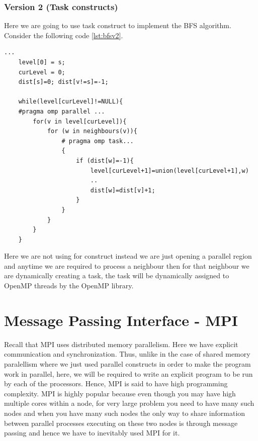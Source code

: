 \documentclass[12pt]{book}
\begin{document}
\subsubsection{Version 2 (Task constructs)}
Here we are going to use task construct to implement the BFS algorithm.
Consider the following code \ref{lst:bfsv2}.
\begin{lstlisting}[caption={BFS-Example},captionpos=b,label={lst:bfsv2}]
...
    level[0] = s;
    curLevel = 0;
    dist[s]=0; dist[v!=s]=-1;

    while(level[curLevel]!=NULL){
    #pragma omp parallel ...
        for(v in level[curLevel]){
            for (w in neighbours(v)){
                # pragma omp task...
                {
                    if (dist[w]=-1){
                        level[curLevel+1]=union(level[curLevel+1],w)
                        ..
                        dist[w]=dist[v]+1;
                    }
                }
            }       
        }   
    }
\end{lstlisting}
Here we are not using for construct instead we are just opening a parallel region and anytime we are required to process a neighbour then for that neighbour we are dynamically creating a task, the task will be dynamically assigned to OpenMP threads by the OpenMP library.

\newpage

\section{Message Passing Interface - MPI}
Recall that MPI uses distributed memory parallelism. Here we have explicit communication and synchronization. Thus, unlike in the case of shared memory paralellism where we just used parallel constructs in order to make the program work in parallel, here, we will be required to write an explicit program to be run by each of the processors. Hence, MPI is said to have high programming complexity. MPI is highly popular because even though you may have high multiple cores within a node, for very large problem you need to have many such nodes and when you have many such nodes the only way to share information between parallel processes executing on these two nodes is through message passing and hence we have to inevitably used MPI for it.
\end{document}
